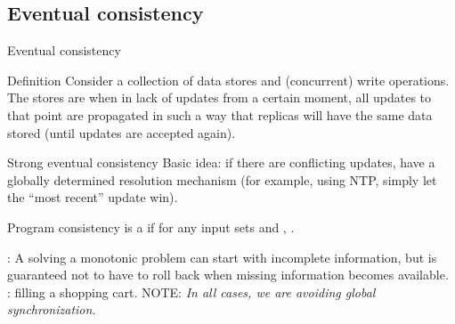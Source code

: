 \subsection{Eventual consistency}
\begin{slide}{Eventual consistency}
  \begin{block}{Definition}
    Consider a collection of data stores and (concurrent) write operations. The stores are  when in lack of updates from a certain moment, all updates to that point are propagated in
    such a way that replicas will have the same data stored (until updates are accepted again).
  \end{block}

  \begin{block}{Strong eventual consistency}
    Basic idea: if there are conflicting updates, have a globally determined resolution mechanism (for
    example, using NTP, simply let the ``most recent'' update win). 
  \end{block}

  \begin{block}{Program consistency}
     is a  if for any input sets  and ,
    .

    : A  solving a monotonic problem can start with incomplete information, but
    is guaranteed not to have to roll back when missing information becomes available. :
    filling a shopping cart.
    NOTE: \emph{In all cases, we are avoiding global 
    synchronization.}
  \end{block}
\end{slide}
